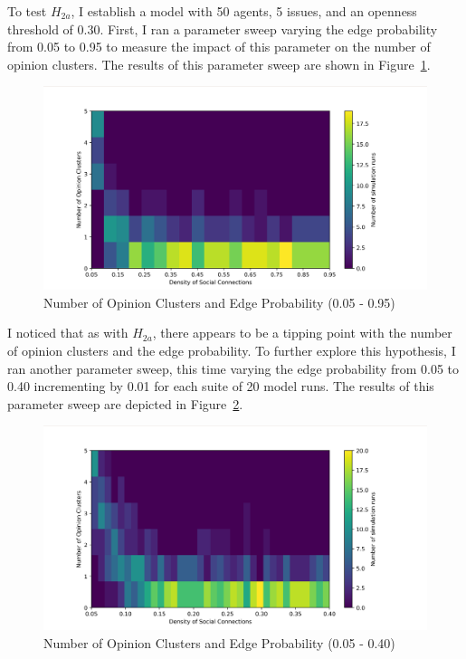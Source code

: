 To test $H_{2a}$, I establish a model with 50 agents, 5 issues, and an
openness threshold of 0.30. First, I ran a parameter sweep varying the edge
probability from 0.05 to 0.95 to measure the impact of this parameter on the
number of opinion clusters. The results of this parameter sweep are shown in
Figure~\ref{H2a_plot_big}.

\begin{figure}
\centering
\includegraphics[width=1.0\columnwidth]{./Graphs/ClusterEdge/Cluster_edgeBig.png}
\caption{Number of Opinion Clusters and Edge Probability (0.05 - 0.95)}
\label{H2a_plot_big}
\end{figure}

I noticed that as with $H_{2a}$, there appears to be a tipping point with the
number of opinion clusters and the edge probability. To further explore this
hypothesis, I ran another parameter sweep, this time varying the edge
probability from 0.05 to 0.40 incrementing by 0.01 for each suite of 20 model
runs. The results of this parameter sweep are depicted in
Figure~\ref{H2a_plot_small}.

\begin{figure}
\centering
\includegraphics[width=1.0\columnwidth]{./Graphs/ClusterEdge/Cluster_edgesmall.png}
\caption{Number of Opinion Clusters and Edge Probability (0.05 - 0.40)}
\label{H2a_plot_small}
\end{figure}

